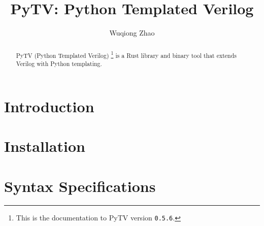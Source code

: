 \documentclass{article}
\title{PyTV: Python Templated Verilog}
\author{Wuqiong Zhao}
\newcommand{\pytvversion}{0.5.6}
\begin{document}
\maketitle

\begin{abstract}
  PyTV (Python Templated Verilog)%
  \footnote{This is the documentation to PyTV version \texttt{\pytvversion{}}.}
  is a Rust library and binary tool that extends Verilog with Python templating.
\end{abstract}

\tableofcontents

\section{Introduction}\label{sec:introduction}


\section{Installation}\label{sec:installation}


\section{Syntax Specifications}\label{sec:syntax}



{}
\bgroup
\small

\egroup
\end{document}
